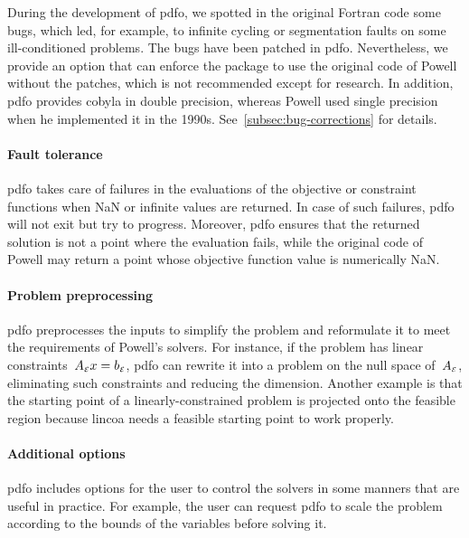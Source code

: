 During the development of \gls{pdfo}, we spotted in the original Fortran code some bugs, which led, for example, to infinite cycling or segmentation faults on some ill-conditioned problems.
The bugs have been patched in \gls{pdfo}.
Nevertheless, we provide an option that can enforce the package to use the original code of Powell without the patches, which is not recommended except for research.
In addition, \gls{pdfo} provides \gls{cobyla} in double precision, whereas Powell used single precision when he implemented it in the 1990s.
See~\cref{subsec:bug-corrections} for details.

\paragraph{Fault tolerance}

\Gls{pdfo} takes care of failures in the evaluations of the objective or constraint functions when NaN or infinite values are returned.
In case of such failures, \gls{pdfo} will not exit but try to progress.
Moreover, \gls{pdfo} ensures that the returned solution is not a point where the evaluation fails, while the original code of Powell may return a point whose objective function value is numerically NaN.

\paragraph{Problem preprocessing}

\gls{pdfo} preprocesses the inputs to simplify the problem and reformulate it to meet the requirements of Powell's solvers.
For instance, if the problem has linear constraints~$A_{\scriptscriptstyle\ieq} \iter = b_{\scriptscriptstyle\ieq}$, \gls{pdfo} can rewrite it into a problem on the null space of~$A_{\scriptscriptstyle\mathcal{E}}$, eliminating such constraints and reducing the dimension.
Another example is that the starting point of a linearly-constrained problem is projected onto the feasible region because \gls{lincoa} needs a feasible starting point to work properly.

\paragraph{Additional options}

\gls{pdfo} includes options for the user to control the solvers in some manners that are useful in practice.
For example, the user can request \gls{pdfo} to scale the problem according to the bounds of the variables before solving it.

